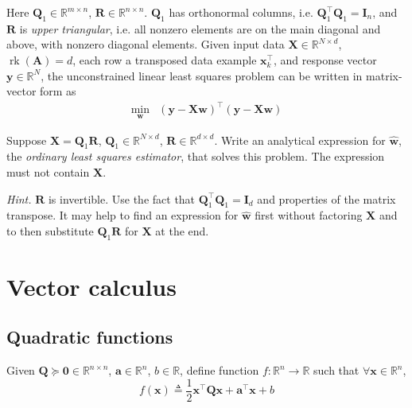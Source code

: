 \documentclass{article}
\numberwithin{equation}{section}
\begin{document}
Here $ \mathbf{Q}_1 \in \mathbb{R}^{m \times n} $, $ \mathbf{R} \in
\mathbb{R}^{n \times n} $. $ \mathbf{Q}_1 $ has orthonormal columns, i.e.
$ \mathbf{Q}_1^\top\mathbf{Q}_1 = \mathbf{I}_n $, and $ \mathbf{R} $ is
\textit{upper triangular}, i.e. all nonzero elements are on the main diagonal
and above, with nonzero diagonal elements. Given input data
$ \mathbf{X} \in \mathbb{R}^{N \times d} $,
$ \operatorname{rk}(\mathbf{A}) = d $, each row a transposed data example
$ \mathbf{x}_k^\top $, and response vector $ \mathbf{y} \in \mathbb{R}^N $,
the unconstrained linear least squares problem can be written in matrix-vector
form as
\begin{equation*}
    \begin{array}{ll}
        \displaystyle\min_\mathbf{w} &
        (\mathbf{y} - \mathbf{Xw})^\top(\mathbf{y} - \mathbf{Xw})
    \end{array}
\end{equation*}

Suppose $ \mathbf{X} = \mathbf{Q}_1\mathbf{R} $, $ \mathbf{Q}_1 \in
\mathbb{R}^{N \times d} $, $ \mathbf{R} \in \mathbb{R}^{d \times d} $. Write
an analytical expression for $ \hat{\mathbf{w}} $, the \textit{ordinary least
squares estimator}, that solves this problem. The expression must not contain
$ \mathbf{X} $.

\medskip

\textit{Hint.} $ \mathbf{R} $ is invertible. Use the fact that
$ \mathbf{Q}_1^\top\mathbf{Q}_1 = \mathbf{I}_d $ and properties of the matrix
transpose. It may help to find an expression for $ \hat{\mathbf{w}} $ first
without factoring $ \mathbf{X} $ and to then substitute
$ \mathbf{Q}_1\mathbf{R} $ for $ \mathbf{X} $ at the end.

\section{Vector calculus}

\subsection{Quadratic functions}

Given $ \mathbf{Q} \succeq \mathbf{0} \in \mathbb{R}^{n \times n} $,
$ \mathbf{a} \in \mathbb{R}^n $, $ b \in \mathbb{R} $, define function
$ f : \mathbb{R}^n \rightarrow \mathbb{R} $ such that $ \forall \mathbf{x} \in
\mathbb{R}^n $,
\begin{equation*}
    f(\mathbf{x}) \triangleq \frac{1}{2}\mathbf{x}^\top\mathbf{Qx} +
    \mathbf{a}^\top\mathbf{x} + b
\end{equation*}
\end{document}
